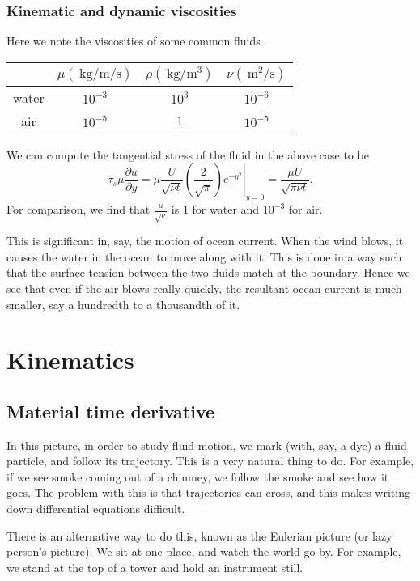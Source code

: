 \documentclass[a4paper]{article}
\begin{document}
\subsubsection{Kinematic and dynamic viscosities}
Here we note the viscosities of some common fluids
\begin{center}
  \begin{tabular}{cccc}
    \toprule
    & $\mu(\SI{}{\kilo\gram\per\meter\per\second})$ & $\rho(\SI{}{\kilo\gram\per\meter\cubed})$ & $\nu(\SI{}{\meter\squared\per\second})$\\
    \midrule
    water & $10^{-3}$ & $10^3$ & $10^{-6}$\\
    air & $10^{-5}$ & $1$ & $10^{-5}$\\
    \bottomrule
  \end{tabular}
\end{center}
We can compute the tangential stress of the fluid in the above case to be
\[
  \tau_s \mu\frac{\partial u}{\partial y} = \left.\mu \frac{U}{\sqrt{\nu t}} \left(\frac{2}{\sqrt{\pi}}\right) e^{-y^{2}}\right|_{y = 0} = \frac{\mu U}{\sqrt{\pi \nu t}}.
\]
For comparison, we find that $\frac{\mu}{\sqrt{\nu}}$ is $1$ for water and $10^{-3}$ for air.

This is significant in, say, the motion of ocean current. When the wind blows, it causes the water in the ocean to move along with it. This is done in a way such that the surface tension between the two fluids match at the boundary. Hence we see that even if the air blows really quickly, the resultant ocean current is much smaller, say a hundredth to a thousandth of it.

\section{Kinematics}
\subsection{Material time derivative}
In this picture, in order to study fluid motion, we mark (with, say, a dye) a fluid particle, and follow its trajectory. This is a very natural thing to do. For example, if we see smoke coming out of a chimney, we follow the smoke and see how it goes. The problem with this is that trajectories can cross, and this makes writing down differential equations difficult.
\begin{center}
\end{center}
There is an alternative way to do this, known as the Eulerian picture (or lazy person's picture). We sit at one place, and watch the world go by. For example, we stand at the top of a tower and hold an instrument still.
\end{document}
